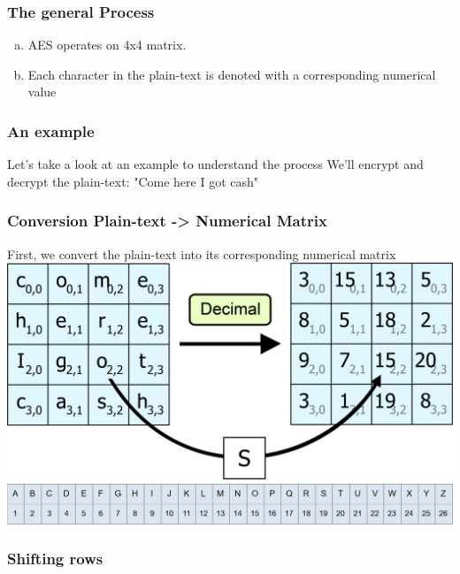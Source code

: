 \documentclass[11pt]{beamer}
\begin{document}
\begin{frame}\frametitle{The general Process}
	\begin{enumerate}[a.]
	\item AES operates on 4x4 matrix.
	\item Each character in the plain-text is denoted with a corresponding numerical value
	\end{enumerate}
\end{frame}

\begin{frame}\frametitle{An example}
\center Let's take a look at an example to understand the process
\center We'll encrypt and decrypt the plain-text:
\center "Come here I got cash"

\end{frame}

\begin{frame}\frametitle{Conversion Plain-text -> Numerical Matrix}
First, we convert the plain-text into its corresponding numerical matrix
\center \includegraphics[scale=0.275]{conversion_AES_1}
\center \includegraphics[scale=0.275]{numerical}
\end{frame}

\begin{frame}\frametitle{Shifting rows}

\end{frame}
\end{document}

